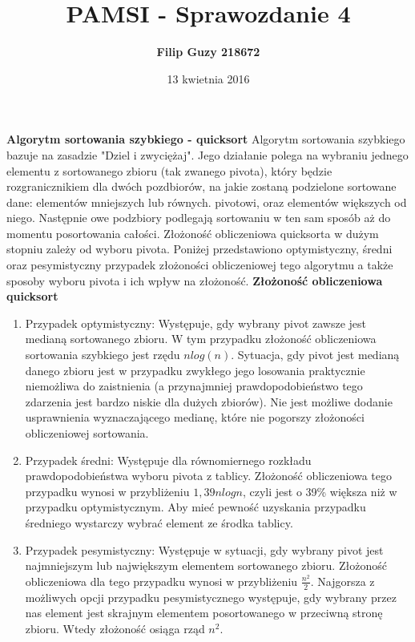 \documentclass[10pt, a4paper]{article}
\date{13 kwietnia 2016}
\title{\textbf{PAMSI - Sprawozdanie 4}}
\author{\textbf{Filip Guzy 218672}}
\begin{document}
\maketitle

\begin{flushleft}
\textbf{Algorytm sortowania szybkiego - quicksort} \newline \newline
Algorytm sortowania szybkiego bazuje na zasadzie "Dziel i zwyciężaj". Jego działanie polega na wybraniu jednego elementu z sortowanego zbioru (tak zwanego pivota), który będzie rozgranicznikiem dla dwóch pozdbiorów, na jakie zostaną podzielone sortowane dane: elementów mniejszych lub równych. pivotowi, oraz elementów większych od niego. Następnie owe podzbiory podlegają sortowaniu w ten sam sposób aż do momentu posortowania całości. Złożoność obliczeniowa quicksorta w dużym stopniu zależy od wyboru pivota. Poniżej przedstawiono optymistyczny, średni oraz pesymistyczny przypadek złożoności obliczeniowej tego algorytmu a także sposoby wyboru pivota i ich wpływ na złożoność.\newline \newline
\textbf{Złożoność obliczeniowa quicksort}
\begin{enumerate}
\item Przypadek optymistyczny: \newline
Występuje, gdy wybrany pivot zawsze jest medianą sortowanego zbioru. W tym przypadku złożoność obliczeniowa sortowania szybkiego jest rzędu $nlog(n)$. Sytuacja, gdy pivot jest medianą danego zbioru jest w przypadku zwykłego jego losowania praktycznie niemożliwa do zaistnienia (a przynajmniej prawdopodobieństwo tego zdarzenia jest bardzo niskie dla dużych zbiorów). Nie jest możliwe dodanie usprawnienia wyznaczającego medianę, które nie pogorszy złożoności obliczeniowej sortowania.
\item Przypadek średni: \newline
Występuje dla równomiernego rozkładu prawdopodobieństwa wyboru pivota z tablicy. Złożoność obliczeniowa tego przypadku wynosi w przybliżeniu $1,39nlogn$, czyli jest o 39\% większa niż w przypadku optymistycznym. Aby mieć pewność uzyskania przypadku średniego wystarczy wybrać element ze środka tablicy.\newline
\item Przypadek pesymistyczny: \newline
Występuje w sytuacji, gdy wybrany pivot jest najmniejszym lub największym elementem sortowanego zbioru. Złożoność obliczeniowa dla tego przypadku wynosi w przybliżeniu $\frac{n^2}{2}$. Najgorsza z możliwych opcji przypadku pesymistycznego występuje, gdy wybrany przez nas element jest skrajnym elementem posortowanego w przeciwną stronę zbioru. Wtedy złożoność osiąga rząd $n^2$.
\end{enumerate}


\end{flushleft}
\end{document}

